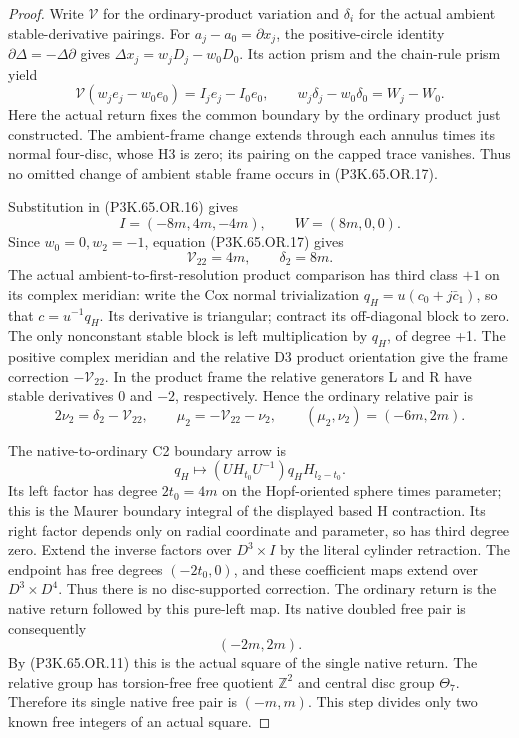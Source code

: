 \begin{proof}
Write \(\mathcal V\) for the ordinary-product variation and
\(\delta_i\) for the actual ambient stable-derivative pairings.
For \(a_j-a_0=\partial x_j\), the positive-circle identity
\(\partial\Delta=-\Delta\partial\) gives
\(\Delta x_j=w_jD_j-w_0D_0\). Its action prism and the chain-rule
prism yield
\[
 \mathcal V(w_je_j-w_0e_0)=I_je_j-I_0e_0,\qquad
 w_j\delta_j-w_0\delta_0=W_j-W_0.                    \tag{P3K.65.OR.17}
\]
Here the actual return fixes the common boundary by the ordinary
product just constructed. The ambient-frame change extends
through each annulus times its normal four-disc, whose H3 is zero;
its pairing on the capped trace vanishes. Thus no omitted change
of ambient stable frame occurs in (P3K.65.OR.17).

Substitution in (P3K.65.OR.16) gives
\[
                    I=(-8m,4m,-4m),\qquad W=(8m,0,0).
\]
Since \(w_0=0,w_2=-1\), equation (P3K.65.OR.17) gives
\[
                    \mathcal V_{22}=4m,\qquad \delta_2=8m.
\]
The actual ambient-to-first-resolution product comparison has
third class \(+1\) on its complex meridian: write the Cox normal
trivialization \(q_H=u(c_0+j\bar c_1)\), so that
\(c=u^{-1}q_H\). Its derivative is triangular; contract its
off-diagonal block to zero. The only nonconstant stable block
is left multiplication by \(q_H\), of degree +1. The positive
complex meridian and the relative D3 product orientation give
the frame correction \(-\mathcal V_{22}\). In the product frame
the relative generators L and R have stable derivatives 0 and
\(-2\), respectively. Hence the ordinary relative pair is
\[
 2\nu_2=\delta_2-\mathcal V_{22},\qquad
 \mu_2=-\mathcal V_{22}-\nu_2,
 \qquad (\mu_2,\nu_2)=(-6m,2m).                    \tag{P3K.65.OR.18}
\]

The native-to-ordinary C2 boundary arrow is
\[
 q_H\mapsto (U H_{t_0}U^{-1})q_H H_{l_2-t_0}.        \tag{P3K.65.OR.19}
\]
Its left factor has degree \(2t_0=4m\) on the Hopf-oriented
sphere times parameter; this is the Maurer boundary integral
of the displayed based H contraction. Its right factor depends
only on radial coordinate and parameter, so has third degree
zero. Extend the inverse factors over \(D^3\times I\) by the
literal cylinder retraction. The endpoint has free degrees
\((-2t_0,0)\), and these coefficient maps extend over
\(D^3\times D^4\). Thus there is no disc-supported correction.
The ordinary return is the native return followed by this
pure-left map. Its native doubled free pair is consequently
\[
                         (-2m,2m).                  \tag{P3K.65.OR.20}
\]
By (P3K.65.OR.11) this is the actual square of the single native return.
The relative group has torsion-free free quotient \(\mathbb Z^2\)
and central disc group \(\Theta_7\). Therefore its single native
free pair is \((-m,m)\). This step divides only two known free
integers of an actual square.


\end{proof}
